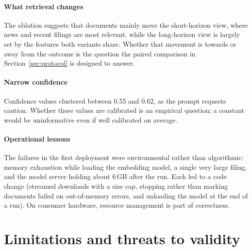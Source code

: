 \documentclass[preprint,11pt]{elsarticle}
\begin{document}
\paragraph{What retrieval changes} The ablation suggests that documents mainly move the short-horizon view,
where news and recent filings are most relevant, while the long-horizon view is largely set by the features
both variants share. Whether that movement is towards or away from the outcome is the question the paired
comparison in Section~\ref{sec:protocol} is designed to answer.

\paragraph{Narrow confidence} Confidence values clustered between 0.55 and 0.62, as the prompt requests
caution. Whether these values are calibrated \cite{guo2017calibration} is an empirical question; a constant
would be uninformative even if well calibrated on average.

\paragraph{Operational lessons} The failures in the first deployment were environmental rather than
algorithmic: memory exhaustion while loading the embedding model, a single very large filing, and the model
server holding about 6\,GB after the run. Each led to a code change (streamed downloads with a size cap,
stopping rather than marking documents failed on out-of-memory errors, and unloading the model at the end of
a run). On consumer hardware, resource management is part of correctness.

\section{Limitations and threats to validity}
\label{sec:limitations}
\end{document}
